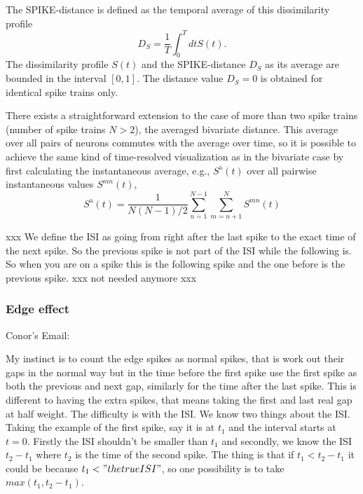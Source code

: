 \documentclass[10pt,twocolumn]{elsart5p}
\begin{document}
The SPIKE-distance is defined as the temporal average of this dissimilarity profile
%
\begin{equation} \label{eq:Temporal-Average}
    D_S = \frac{1}{T} \int_{0}^T dt S (t).
\end{equation}
%
The dissimilarity profile $S (t)$ and the SPIKE-distance $D_S$ as its average are bounded in the interval $[0, 1]$. The distance value $D_S = 0$ is obtained for identical spike trains only.

There exists a straightforward extension to the case of more than two spike trains (number of spike trains $N > 2$), the averaged bivariate distance. This average over all pairs of neurons commutes with the average over time, so it is possible to achieve the same kind of time-resolved visualization as in the bivariate case by first calculating the instantaneous average, e.g., $S^{\mathrm {a}} (t)$ over all pairwise instantaneous values $S^{mn} (t)$,
%
\begin{equation} \label{eq:Bivariate-Average}
    S^{\mathrm {a}} (t) = \frac{1}{N(N-1)/2}\sum_{n=1}^{N-1} \sum_{m=n+1}^N S^{mn} (t)
\end{equation}




xxx We define the ISI as going from right after the last spike to the exact time of the next spike. So the previous spike is not part of the ISI while the following is. So when you are on a spike this is the following spike and the one before is the previous spike. xxx not needed anymore xxx


\subsubsection{\label{sss:Edge-effect} Edge effect}

Conor's Email:

My instinct is to count the edge spikes as normal spikes, that is work out their gaps in the normal way but in the time before the first spike use the first spike as both the previous and next gap, similarly for the time after the last spike. This is different to having the extra spikes, that means taking the first and last real gap at half weight. The difficulty is with the ISI. We know two things about the ISI. Taking the example of the first spike, say it is at $t_1$ and the interval starts at $t=0$. Firstly the ISI shouldn't be smaller than $t_1$ and secondly, we know the ISI $t_2-t_1$ where $t_2$ is the time of the second spike. The thing is that if $t_1 < t_2-t_1$ it could be because $t_1 < "the true ISI"$, so one possibility is to take $max(t_1,t_2-t_1)$.
\end{document}
